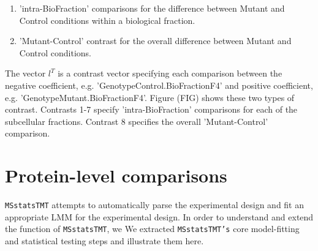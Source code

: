 \documentclass[11pt]{elife}\usepackage[]{graphicx}\usepackage[]{color}
\begin{document}
\begin{enumerate}
	\item 'intra-BioFraction' comparisons for the difference between
		Mutant and Control conditions within a biological fraction.
	\item 'Mutant-Control' contrast for the overall difference between
		Mutant and Control conditions.
\end{enumerate}

The vector $l^T$ is a contrast vector specifying each comparison between the
negative coefficient, e.g. 'GenotypeControl.BioFractionF4' and positive
coefficient, e.g. 'GenotypeMutant.BioFractionF4'. Figure (FIG) shows these two
types of contrast. Contrasts 1-7 specify 'intra-BioFraction' comparisons for
each of the subcellular fractions. Contrast 8 specifies the overall
'Mutant-Control' comparison.\\

\section{Protein-level comparisons}

\texttt{MSstatsTMT} attempts to automatically parse the experimental design and
fit an appropriate LMM for the experimental design. 
In order to understand and extend the function of \texttt{MSstatsTMT}, we 
We extracted \texttt{MSstatsTMT's} core model-fitting and statistical testing 
steps and illustrate them here.\\
\end{document}
